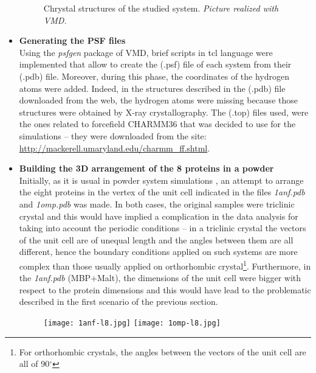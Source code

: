 \begin{itemize}
\begin{figure}[h]
\vspace{-0.25cm}
    \footnotesize{\caption{Chrystal structures of the studied system. \textit{Picture realized with VMD.}}
    \label{fig:pdb-structures}
    }
\end{figure}

\item \textbf{Generating the PSF files}\\
Using the \textit{psfgen} package of VMD, brief scripts in tcl language were implemented that allow to create the (.psf) file of each system from their (.pdb) file. Moreover, during this phase, the coordinates of the hydrogen atoms were added. Indeed, in the structures described in the (.pdb) file downloaded from the web, the hydrogen atoms were missing because those structures were obtained by X-ray crystallography. The (.top) files used, were the ones related to forcefield CHARMM36 that was decided to use for the simulations -- they were downloaded from the site: \url{http://mackerell.umaryland.edu/charmm_ff.shtml}. 

\item \textbf{Building the 3D arrangement of the 8 proteins in a powder}\\
Initially, as it is usual in powder system simulations \cite{rahaman2017configurational, fichou2015molecular}, an attempt to arrange the eight proteins in the vertex of the unit cell indicated in the files \textit{1anf.pdb} and \textit{1omp.pdb} was made. In both cases, the original samples were triclinic crystal and this would have implied a complication in the data analysis for taking into account the periodic conditions -- in a triclinic crystal the vectors of the unit cell are of unequal length and the angles between them are all different, hence the boundary conditions applied on such systems are more complex than those usually applied on orthorhombic crystal\footnote{For orthorhombic crystals, the angles between the vectors of the unit cell are all of 90$^\circ$}. Furthermore, in the \textit{1anf.pdb} (MBP+Malt), the dimensions of the unit cell were bigger with respect to the protein dimensions and this would have lead to the problematic described in the first scenario of the previous section.
\begin{figure}[h]
\begin{center}
\begin{minipage}[t]{0.9\textwidth}
\centering
\hfill
\texttt{[image: 1anf-l8.jpg]}
\hspace{0.65cm}
\texttt{[image: 1omp-l8.jpg]}
\hfill
\end{minipage} 


\end{center}
\end{figure}
\end{itemize}
